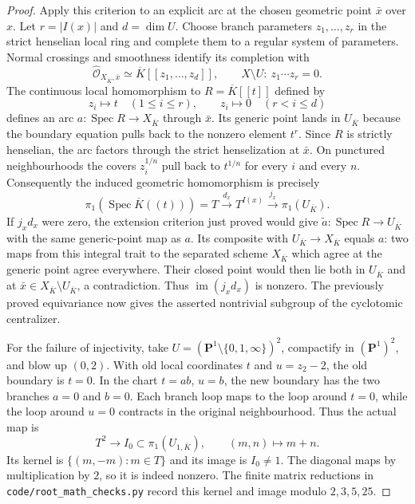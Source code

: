 \begin{proof}
Apply this criterion to an explicit arc at the chosen geometric point
$\bar x$ over $x$. Let $r=|I(x)|$ and $d=\dim U$. Choose branch
parameters $z_1,\ldots,z_r$ in the strict henselian local ring and
complete them to a regular system of parameters. Normal crossings and
smoothness identify its completion with
\[
 \widehat{\mathcal O}_{X_{\overline K},\bar x}
   \simeq\overline K[[z_1,\ldots,z_d]],
 \qquad X\setminus U:\ z_1\cdots z_r=0.
\]
The continuous local homomorphism to $R=\overline K[[t]]$ defined by
\[
 z_i\longmapsto t\quad(1\le i\le r),\qquad
 z_i\longmapsto0\quad(r<i\le d)
\]
defines an arc $a:\operatorname{Spec}R\to X_{\overline K}$ through
$\bar x$. Its generic point lands in $U_{\overline K}$ because the
boundary equation pulls back to the nonzero element $t^r$.
Since $R$ is strictly henselian, the arc factors through the strict
henselization at $\bar x$. On punctured neighbourhoods the covers
$z_i^{1/n}$ pull back to $t^{1/n}$ for every $i$ and every $n$.
Consequently the induced geometric homomorphism is precisely
\[
 \pi_1(\operatorname{Spec}\overline K((t)))
   =T\xrightarrow{d_x}T^{I(x)}\xrightarrow{j_x}\pi_1(U_{\overline K}).
\]
If $j_xd_x$ were zero, the extension criterion just proved would give
$\widetilde a:\operatorname{Spec}R\to U_{\overline K}$ with the same
generic-point map as $a$. Its composite with $U_{\overline K}\to
X_{\overline K}$ equals $a$: two maps from this integral trait to the
separated scheme $X_{\overline K}$ which agree at the generic point
agree everywhere. Their closed point would then lie both in
$U_{\overline K}$ and at $\bar x\in X_{\overline K}\setminus
U_{\overline K}$, a contradiction. Thus $\operatorname{im}(j_xd_x)$
is nonzero. The previously proved equivariance now gives the asserted
nontrivial subgroup of the cyclotomic centralizer.

For the failure of injectivity, take
$U=(\mathbf P^1\setminus\{0,1,\infty\})^2$, compactify in
$(\mathbf P^1)^2$, and blow up $(0,2)$. With old local coordinates
$t$ and $u=z_2-2$, the old boundary is $t=0$. In the chart
$t=ab$, $u=b$, the new boundary has the two branches $a=0$ and $b=0$.
Each branch loop maps to the loop around $t=0$, while the loop around
$u=0$ contracts in the original neighbourhood. Thus the actual map is
\[
 T^2\longrightarrow I_0\subset\pi_1(U_{1,\overline K}),
 \qquad(m,n)\longmapsto m+n.
\]
Its kernel is $\{(m,-m):m\in T\}$ and its image is $I_0\ne1$.
The diagonal maps by multiplication by $2$, so it is indeed nonzero.
The finite matrix reductions in \texttt{code/root\_math\_checks.py}
record this kernel and image modulo $2,3,5,25$.
\end{proof}

